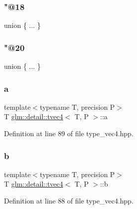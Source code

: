 \mbox{\label{structglm_1_1detail_1_1tvec4_a31ff7687ef5aaf76c75d0b4aa959ac40}} 
\subsubsection{\texorpdfstring{"@18}{@18}}
{\footnotesize\ttfamily union \{ ... \} }

\mbox{\label{structglm_1_1detail_1_1tvec4_a2171a9e72c5deabe5e49d8cc789accef}} 
\subsubsection{\texorpdfstring{"@20}{@20}}
{\footnotesize\ttfamily union \{ ... \} }

\mbox{\label{structglm_1_1detail_1_1tvec4_a0df75f03c55bcf27c344d34d8648f24e}} 
\subsubsection{\texorpdfstring{a}{a}}
{\footnotesize\ttfamily template$<$typename T, precision P$>$ \\
T \hyperlink{structglm_1_1detail_1_1tvec4}{glm\+::detail\+::tvec4}$<$ T, P $>$\+::a}



Definition at line 89 of file type\+\_\+vec4.\+hpp.

\mbox{\label{structglm_1_1detail_1_1tvec4_afad14b1ed68cf8402c636513ec04ba33}} 
\subsubsection{\texorpdfstring{b}{b}}
{\footnotesize\ttfamily template$<$typename T, precision P$>$ \\
T \hyperlink{structglm_1_1detail_1_1tvec4}{glm\+::detail\+::tvec4}$<$ T, P $>$\+::b}



Definition at line 88 of file type\+\_\+vec4.\+hpp.

\mbox{\label{structglm_1_1detail_1_1tvec4_a9efd411700d82e7454d65298e0381dc9}} 
